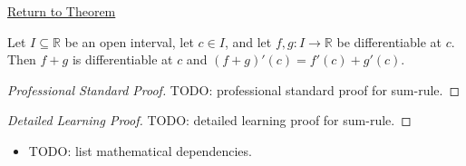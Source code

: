 \newpage
{}
\label{prf:sum-rule}

\begin{remark*}[Return]
\hyperref[thm:sum-rule]{Return to Theorem}
\end{remark*}

\begin{theorem*}
Let $I \subseteq \mathbb{R}$ be an open interval, let $c \in I$, and let $f, g : I \to \mathbb{R}$ be differentiable at $c$. Then $f + g$ is differentiable at $c$ and $(f + g)'(c) = f'(c) + g'(c)$.
\end{theorem*}

\begin{proof}[Professional Standard Proof]
\LRAProofBodyStart
TODO: professional standard proof for sum-rule.
\end{proof}

\begin{proof}[Detailed Learning Proof]
\LRAProofBodyStart
TODO: detailed learning proof for sum-rule.
\end{proof}

\begin{remark*}
\end{remark*}

\begin{dependencies}
\begin{itemize}
  \item TODO: list mathematical dependencies.
\end{itemize}
\end{dependencies}

\clearpage
